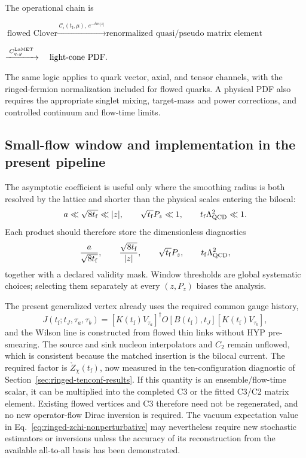 \documentclass[11pt]{article}
\numberwithin{equation}{section}
\newcommand{\tf}{t_{\mathrm f}}
\begin{document}
The operational chain is
\begin{center}
\(\text{flowed Clover}
 \xrightarrow{\;\mathcal C_i(\tf,\mu),\,e^{-\delta m|z|}\;}
 \text{renormalized quasi/pseudo matrix element}\)
\par\vspace{2pt}
\(\xrightarrow{\;C^{\rm LaMET}_{q,g}\;}\quad
 \text{light-cone PDF}.\)
\end{center}
The same logic applies to quark vector, axial, and tensor channels, with the
ringed-fermion normalization included for flowed quarks.  A physical PDF also
requires the appropriate singlet mixing, target-mass and power corrections,
and controlled continuum and flow-time limits.

\subsection{Small-flow window and implementation in the present pipeline}
\label{sec:sfte-implementation}

The asymptotic coefficient is useful only where the smoothing radius is both
resolved by the lattice and shorter than the physical scales entering the
bilocal:
\begin{equation}
  a\ll\sqrt{8\tf}\ll|z|,
  \qquad
  \sqrt{\tf}P_z\ll1,
  \qquad
  \tf\Lambda_{\rm QCD}^2\ll1.
  \label{eq:sfte-window}
\end{equation}
Each product should therefore store the dimensionless diagnostics
\begin{equation}
  \frac{a}{\sqrt{8\tf}},\qquad
  \frac{\sqrt{8\tf}}{|z|},\qquad
  \sqrt{\tf}P_z,\qquad
  \tf\Lambda_{\rm QCD}^2,
  \label{eq:sfte-diagnostics}
\end{equation}
together with a declared validity mask.  Window thresholds are global
systematic choices; selecting them separately at every \((z,P_z)\) biases the
analysis.

The present generalized vertex already uses the required common gauge history,
\begin{equation}
  J(\tf;t_J,\tau_a,\tau_b)
  =[K(\tf)V_{\tau_a}]^\dagger
  O[B(\tf),t_J]
  [K(\tf)V_{\tau_b}],
\end{equation}
and the Wilson line is constructed from flowed thin links without HYP
pre-smearing.  The source and sink nucleon interpolators and \(C_2\) remain
unflowed, which is consistent because the matched insertion is the bilocal
current. The required factor is \(\mathring Z_\chi(\tf)\), now measured in
the ten-configuration diagnostic of Section~\ref{sec:ringed-tenconf-results}.
If this quantity is
an ensemble/flow-time scalar, it can be multiplied into the completed C3 or
the fitted C3/C2 matrix element.  Existing flowed vertices and C3 therefore
need not be regenerated, and no new operator-flow Dirac inversion is required.
The vacuum expectation value in Eq.~\eqref{eq:ringed-zchi-nonperturbative} may
nevertheless require new stochastic estimators or inversions unless the
accuracy of its reconstruction from the available all-to-all basis has been
demonstrated.
\end{document}
